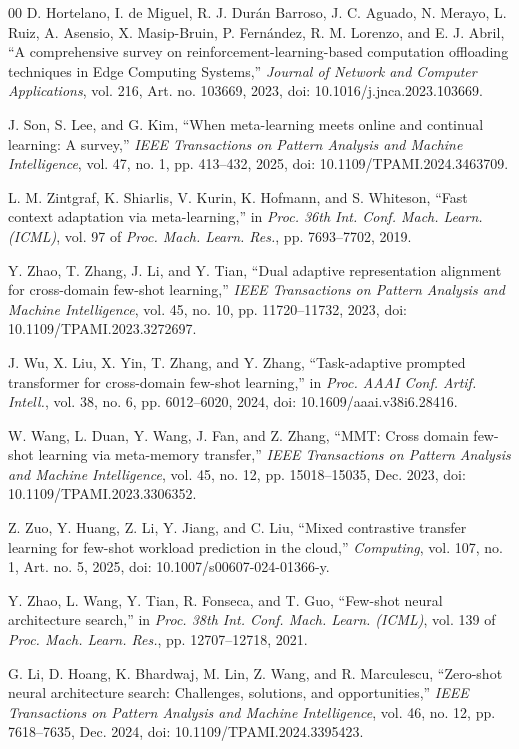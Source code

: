 \documentclass[a4paper,fleqn]{cas-sc}
\begin{document}
\begin{thebibliography}{00}
 D. Hortelano, I. de Miguel, R. J. Dur{\'a}n Barroso,
J. C. Aguado, N. Merayo, L. Ruiz, A. Asensio, X. Masip-Bruin,
P. Fern{\'a}ndez, R. M. Lorenzo, and E. J. Abril,
``A comprehensive survey on reinforcement-learning-based computation
offloading techniques in Edge Computing Systems,''
\emph{Journal of Network and Computer Applications}, vol. 216,
Art. no. 103669, 2023, doi: 10.1016/j.jnca.2023.103669.

 J. Son, S. Lee, and G. Kim, ``When meta-learning meets online and continual learning: A survey,'' \emph{IEEE Transactions on Pattern Analysis and Machine Intelligence}, vol. 47, no. 1, pp. 413--432, 2025, doi: 10.1109/TPAMI.2024.3463709.

 L. M. Zintgraf, K. Shiarlis, V. Kurin, K. Hofmann, and S. Whiteson, ``Fast context adaptation via meta-learning,'' in \emph{Proc. 36th Int. Conf. Mach. Learn. (ICML)}, vol. 97 of \emph{Proc. Mach. Learn. Res.}, pp. 7693--7702, 2019.

 Y. Zhao, T. Zhang, J. Li, and Y. Tian, ``Dual adaptive representation alignment for cross-domain few-shot learning,'' \emph{IEEE Transactions on Pattern Analysis and Machine Intelligence}, vol. 45, no. 10, pp. 11720--11732, 2023, doi: 10.1109/TPAMI.2023.3272697.

 J. Wu, X. Liu, X. Yin, T. Zhang, and Y. Zhang, ``Task-adaptive prompted transformer for cross-domain few-shot learning,'' in \emph{Proc. AAAI Conf. Artif. Intell.}, vol. 38, no. 6, pp. 6012--6020, 2024, doi: 10.1609/aaai.v38i6.28416.

 W. Wang, L. Duan, Y. Wang, J. Fan, and Z. Zhang, ``MMT: Cross domain few-shot learning via meta-memory transfer,'' \emph{IEEE Transactions on Pattern Analysis and Machine Intelligence}, vol. 45, no. 12, pp. 15018--15035, Dec. 2023, doi: 10.1109/TPAMI.2023.3306352.

 Z. Zuo, Y. Huang, Z. Li, Y. Jiang, and C. Liu, ``Mixed contrastive transfer learning for few-shot workload prediction in the cloud,'' \emph{Computing}, vol. 107, no. 1, Art. no. 5, 2025, doi: 10.1007/s00607-024-01366-y.

 Y. Zhao, L. Wang, Y. Tian, R. Fonseca, and T. Guo, ``Few-shot neural architecture search,'' in \emph{Proc. 38th Int. Conf. Mach. Learn. (ICML)}, vol. 139 of \emph{Proc. Mach. Learn. Res.}, pp. 12707--12718, 2021.

 G. Li, D. Hoang, K. Bhardwaj, M. Lin, Z. Wang, and R. Marculescu, ``Zero-shot neural architecture search: Challenges, solutions, and opportunities,'' \emph{IEEE Transactions on Pattern Analysis and Machine Intelligence}, vol. 46, no. 12, pp. 7618--7635, Dec. 2024, doi: 10.1109/TPAMI.2024.3395423.


\end{thebibliography}
\end{document}
